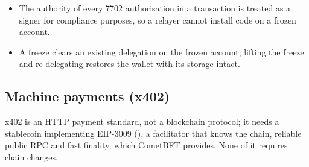 \begin{itemize}
\item The authority of every 7702 authorisation in a transaction is treated as
  a signer for compliance purposes, so a relayer cannot install code on a
  frozen account.
\item A freeze clears an existing delegation on the frozen account; lifting the
  freeze and re-delegating restores the wallet with its storage intact.
\end{itemize}

\subsection{Machine payments (x402)}

x402 is an HTTP payment standard, not a blockchain protocol; it needs a
stablecoin implementing EIP-3009 (), a
facilitator that knows the chain, reliable public RPC and fast finality, which
CometBFT provides. None of it requires chain changes. 
